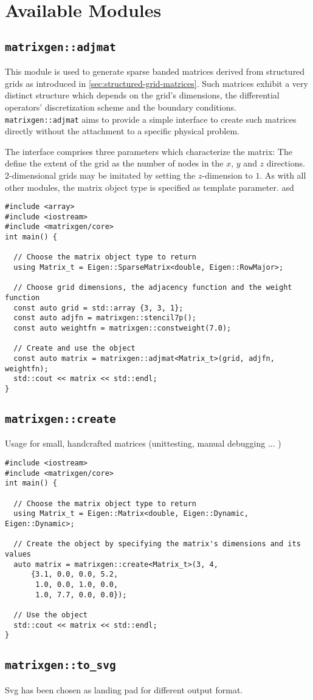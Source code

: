 \chapter{Available Modules}

  \section{\texttt{matrixgen::adjmat}}

    This module is used to generate sparse banded matrices derived from structured grids as introduced in
    \ref{sec:structured-grid-matrices}. Such matrices exhibit a very distinct structure which depends on the grid's
    dimensions, the differential operators' discretization scheme and the boundary conditions.
    \texttt{matrixgen::adjmat} aims to provide a simple interface to create such matrices directly without the
    attachment to a specific physical problem.

    The interface comprises three parameters which characterize the matrix: The  define the extent
    of the grid as the number of nodes in the $x$, $y$ and $z$ directions. 2-dimensional grids may be imitated by
    setting the $z$-dimension to $1$. As with all other modules, the matrix object type is specified as template
    parameter. asd

    \begin{verbatim}
#include <array>
#include <iostream>
#include <matrixgen/core>
int main() {

  // Choose the matrix object type to return
  using Matrix_t = Eigen::SparseMatrix<double, Eigen::RowMajor>;

  // Choose grid dimensions, the adjacency function and the weight function
  const auto grid = std::array {3, 3, 1};
  const auto adjfn = matrixgen::stencil7p();
  const auto weightfn = matrixgen::constweight(7.0);

  // Create and use the object
  const auto matrix = matrixgen::adjmat<Matrix_t>(grid, adjfn, weightfn);
  std::cout << matrix << std::endl;
}
    \end{verbatim}

  \section{\texttt{matrixgen::create}}

    Usage for small, handcrafted matrices (unittesting, manual debugging ... )
    \begin{verbatim}
#include <iostream>
#include <matrixgen/core>
int main() {

  // Choose the matrix object type to return
  using Matrix_t = Eigen::Matrix<double, Eigen::Dynamic, Eigen::Dynamic>;

  // Create the object by specifying the matrix's dimensions and its values
  auto matrix = matrixgen::create<Matrix_t>(3, 4,
      {3.1, 0.0, 0.0, 5.2,
       1.0, 0.0, 1.0, 0.0,
       1.0, 7.7, 0.0, 0.0});

  // Use the object
  std::cout << matrix << std::endl;
}
    \end{verbatim}

  \section{\texttt{matrixgen::to\_svg}}

    Svg has been chosen as landing pad for different output format.
